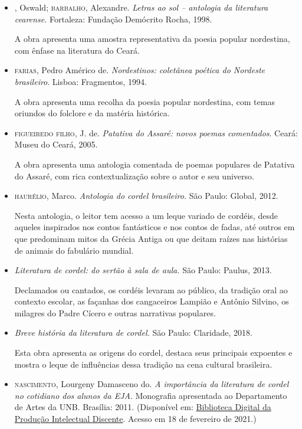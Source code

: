\documentclass[12pt]{extarticle}
\begin{document}
{\begin{itemize}
\item {}, Oswald; \textsc{barbalho}, Alexandre. \textit{Letras ao sol --
antologia da literatura cearense.} Fortaleza: Fundação Demócrito
Rocha, 1998.

A obra apresenta uma amostra representativa da poesia popular
nordestina, com ênfase na literatura do Ceará.

\item \textsc{farias}, Pedro Américo de. \textit{Nordestinos: coletânea poética do
Nordeste brasileiro}. Lisboa: Fragmentos, 1994.

A obra apresenta uma recolha da poesia popular nordestina, com temas
oriundos do folclore e da matéria histórica.

\item \textsc{figueiredo filho}, J. de. \textit{Patativa do Assaré: novos poemas
comentados}. Ceará: Museu do Ceará, 2005.

A obra apresenta uma antologia comentada de poemas populares de Patativa
do Assaré, com rica contextualização sobre o autor e seu universo.

\item \textsc{haurélio}, Marco. \textit{Antologia do cordel brasileiro.} São Paulo:
Global, 2012.

Nesta antologia, o leitor tem acesso a um leque variado de cordéis,
desde aqueles inspirados nos contos fantásticos e nos contos de fadas,
até outros em que predominam mitos da Grécia Antiga ou que deitam raízes
nas histórias de animais do fabulário mundial.

\item {} \textit{Literatura de cordel: do sertão à sala de
aula.} São Paulo: Paulus, 2013.

Declamados ou cantados, os cordéis levaram ao público, da tradição oral
ao contexto escolar, as façanhas dos cangaceiros Lampião e Antônio
Silvino, os milagres do Padre Cícero e outras narrativas populares.

\item {} \textit{Breve história da literatura de cordel.} São
Paulo: Claridade, 2018.

Esta obra apresenta as origens do cordel, destaca seus principais
expoentes e mostra o leque de influências dessa tradição na cena
cultural brasileira.

\item \textsc{nascimento}, Lourgeny Damasceno do. \textit{A importância da literatura
de cordel no cotidiano dos alunos da EJA}. Monografia apresentada ao
Departamento de Artes da UNB. Brasília: 2011. (Disponível em:
\href{https://bdm.unb.br/bitstream/10483/4463/1/2011_LourgenyDamascenodoNascimento.pdf}{Biblioteca Digital da Produção Intelectual Discente}.
Acesso em 18 de fevereiro de 2021.)


\end{itemize}}
\end{document}
